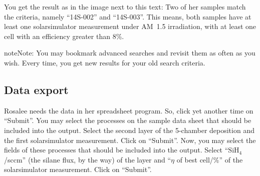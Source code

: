 \documentclass[a4paper,11pt,english]{sphinxmanual}
\begin{document}
You get the result as in the image next to this text: Two of her samples match
the criteria, namely “14S-002” and “14S-003”.  This means, both samples have at
least one solarsimulator measurement under AM 1.5 irradiation, with at least
one cell with an efficiency greater than 8\%.

\begin{notice}{note}{Note:}
You may bookmark advanced searches and revisit them as often as you wish.
Every time, you get new results for your old search criteria.
\end{notice}


\subsection{Data export}
\label{demo:data-export}\label{demo:index-11}
{\hfill{}}

Rosalee needs the data in her spreadsheet program.  So, click yet another time
on “Submit”.  You may select the processes on the sample data sheet that should
be included into the output.  Select the second layer of the 5-chamber
deposition and the first solarsimulator measurement.  Click on “Submit”.  Now,
you may select the fields of these processes that should be included into the
output.  Select “\(\mathrm{SiH}_4\)/sccm” (the silane flux, by the way) of
the layer and “\(\eta\) of best cell/\%” of the solarsimulator measurement.  Click on
“Submit”.
\end{document}
